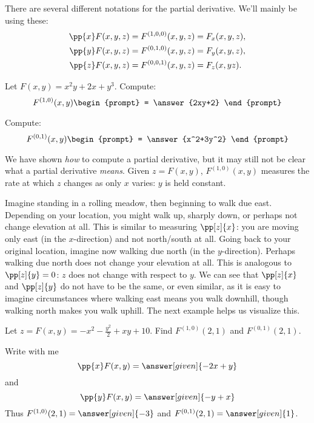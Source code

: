 \documentclass{ximera}
\begin{document}
\begin{definition}
  There are several different notations for the partial derivative.
  We'll mainly be using these:
  \begin{align*}
    \pp{x} F(x,y,z) &= F^{(1,0,0)}(x,y,z) = F_x(x,y,z),\\
    \pp{y} F(x,y,z) &= F^{(0,1,0)}(x,y,z) = F_y(x,y,z),\\
    \pp{z} F(x,y,z) &= F^{(0,0,1)}(x,y,z) = F_z(x,yz).
  \end{align*}
\end{definition}

\begin{question}
  Let $F(x,y) = x^2y + 2x+y^3$. Compute:
  \[
  F^{(1,0)}(x,y)
  \begin{prompt}
    = \answer{2xy+2}
  \end{prompt}
  \]
  \begin{question}
    Compute:
  \[
  F^{(0,1)}(x,y)
  \begin{prompt}
    = \answer{x^2+3y^2}
  \end{prompt}
  \]
  \end{question}
\end{question}

We have shown \textit{how} to compute a partial derivative, but it may
still not be clear what a partial derivative \textit{means}. Given
$z=F(x,y)$, $F^{(1,0)}(x,y)$ measures the rate at which $z$ changes as
only $x$ varies: $y$ is held constant. 

Imagine standing in a rolling meadow, then beginning to walk due
east. Depending on your location, you might walk up, sharply down, or
perhaps not change elevation at all. This is similar to measuring
$\pp[z]{x}$: you are moving only east (in the $x$-direction) and
not north/south at all. Going back to your original location, imagine
now walking due north (in the $y$-direction). Perhaps walking due
north does not change your elevation at all. This is analogous to
$\pp[z]{y}=0$: $z$ does not change with respect to $y$. We can see
that $\pp[z]{x}$ and $\pp[z]{y}$ do not have to be the same, or even
similar, as it is easy to imagine circumstances where walking east
means you walk downhill, though walking north makes you walk uphill.
The next example helps us visualize this.


\begin{example}
  Let $z=F(x,y)=-x^2-\frac{y^2}{2}+xy+10$. Find $F^{(1,0)}(2,1)$ and
  $F^{(0,1)}(2,1)$.
  \begin{explanation}
    Write with me
    \[
    \pp{x}F(x,y) = \answer[given]{-2x+y}
    \]
    and
    \[
    \pp{y}F(x,y) = \answer[given]{-y+x}
    \]
    Thus $F^{(1,0)}(2,1) = \answer[given]{-3}$ and $F^{(0,1)}(2,1) =
    \answer[given]{1}$.
  \end{explanation}
\end{example}
\end{document}
